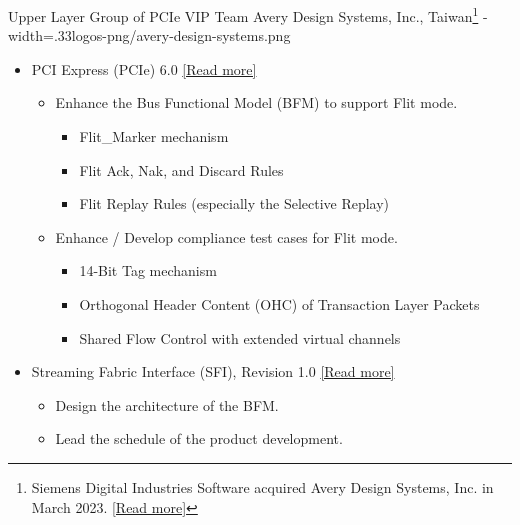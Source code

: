 \documentclass{cvclass}
\newcommand{\simplemmyy}[3]{\shortmmyyformat\formatdate{#3}{#2}{#1}}
\begin{document}
    {Upper Layer Group of PCIe VIP Team}
    {Avery Design Systems, Inc., Taiwan\footnote{Siemens Digital Industries Software acquired Avery Design Systems, Inc. in March 2023. \href{https://newsroom.sw.siemens.com/en-US/siemens-avery-design-systems/}{[Read more]}}}
    {\simplemmyy{2021}{7}{19} - \simplemmyy{2023}{4}{10}}
    {width=.33\linewidth}{logos-png/avery-design-systems.png}
    {\begin{itemize}
        \item PCI Express\textsuperscript{\tiny\textregistered} (PCIe\textsuperscript{\tiny\textregistered}) 6.0 \href{https://pcisig.com/blog/pcie\%C2\%AE-60-specification-webinar-qa-deeper-dive-flit-mode-pam4-and-forward-error-correction-fec}{[Read more]}
        \begin{itemize}
            \item Enhance the Bus Functional Model (BFM) to support Flit mode.
            \begin{itemize}
                \item Flit\_Marker mechanism
                \item Flit Ack, Nak, and Discard Rules
                \item Flit Replay Rules (especially the Selective Replay)
            \end{itemize}
            \item Enhance / Develop compliance test cases for Flit mode.
            \begin{itemize}
                \item 14-Bit Tag mechanism
                \item Orthogonal Header Content (OHC) of Transaction Layer Packets
                \item Shared Flow Control with extended virtual channels
            \end{itemize}
        \end{itemize}
        \item Streaming Fabric Interface (SFI), Revision 1.0 \href{https://www.intel.com/content/www/us/en/content-details/644200/streaming-fabric-interface-sfi-specification.html}{[Read more]}
        \begin{itemize}
            \item Design the architecture of the BFM.
            \item Lead the schedule of the product development.

\end{itemize}
\end{itemize}}
\end{document}
